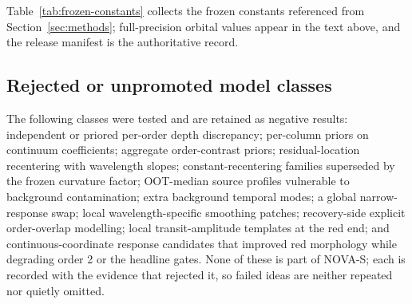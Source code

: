 Table~\ref{tab:frozen-constants} collects the frozen constants referenced
from Section~\ref{sec:methods}; full-precision orbital values appear in
the text above, and the release manifest is the authoritative record.

\subsection{Rejected or unpromoted model classes}

The following classes were tested and are retained as negative results:
independent or priored per-order depth discrepancy; per-column priors on
continuum coefficients; aggregate order-contrast priors;
residual-location recentering with wavelength slopes; constant-recentering
families superseded by the frozen curvature factor; OOT-median source
profiles vulnerable to background contamination; extra background temporal
modes; a global narrow-response swap; local wavelength-specific smoothing
patches; recovery-side explicit order-overlap modelling; local
transit-amplitude templates at the red end; and continuous-coordinate
response candidates that improved red morphology while degrading order 2
or the headline gates. None of these is part of NOVA-S; each is recorded
with the evidence that rejected it, so failed ideas are neither repeated
nor quietly omitted.
